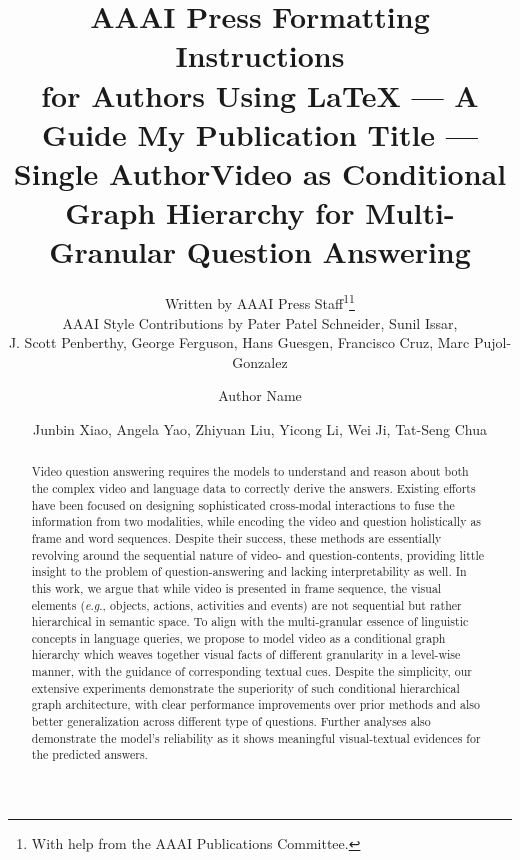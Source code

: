 \documentclass[letterpaper]{article} \usepackage{aaai21}  \usepackage{times}  \usepackage{helvet} \usepackage{courier}  \usepackage[hyphens]{url}  \usepackage{graphicx} \urlstyle{rm} \def\UrlFont{\rm}  \usepackage{natbib}  \usepackage{caption} \usepackage{color, colortbl}
\title{AAAI Press Formatting Instructions \\for Authors Using \LaTeX{} --- A Guide }
\author{

Written by AAAI Press Staff\textsuperscript{\rm 1}\thanks{With help from the AAAI Publications Committee.}\\
    AAAI Style Contributions by Pater Patel Schneider,
    Sunil Issar,  \\
    J. Scott Penberthy,
    George Ferguson,
    Hans Guesgen,
    Francisco Cruz,
    Marc Pujol-Gonzalez
    \\
}
\title{My Publication Title --- Single Author}
\author {
Author Name \\
}
\title{Video as Conditional Graph Hierarchy for Multi-Granular Question Answering}
\author {
Junbin Xiao, Angela Yao, Zhiyuan Liu, Yicong Li, Wei Ji, Tat-Seng Chua \\
}
\newcommand{\eg}{\textit{e}.\textit{g}.}
\begin{document}
\maketitle

\begin{abstract}
Video question answering requires the models to understand and reason about both the complex video and language data to correctly derive the answers. Existing efforts have been focused on designing sophisticated cross-modal interactions to fuse the information from two modalities, while encoding the video and question holistically as frame and word sequences. Despite their success, these methods are essentially revolving around the sequential nature of video- and question-contents, providing little insight to the problem of question-answering and lacking interpretability as well. In this work, we argue that while video is presented in frame sequence, the visual elements (\eg, objects, actions, activities and events) are not sequential but rather hierarchical in semantic space. To align with the multi-granular essence of linguistic concepts in language queries, we propose to model video as a conditional graph hierarchy which weaves together visual facts of different granularity in a level-wise manner, with the guidance of corresponding textual cues. Despite the simplicity, our extensive experiments demonstrate the superiority of such conditional hierarchical graph architecture, with clear performance improvements over prior methods and also better generalization across different type of questions. Further analyses also demonstrate the model's reliability as it shows meaningful visual-textual evidences for the predicted answers.
\end{abstract}

\begin{figure*}[h]
 \centering
 \caption{The bottom-up and top-down insights for video question answering. (a) From a bottom-up view, the video contents are hierarchical from low-level visual entities, their local interactions, to high-level activities and global event. (b) From a top-down view, different questions demand video elements at different granularity (\eg, objects, actions, activities and events) for answers, and a single question might also invoke multi-level visual resources to comprehend.}
 \label{fig:intro_butd}
 \vspace{-1.0em}
\end{figure*}
\end{document}
